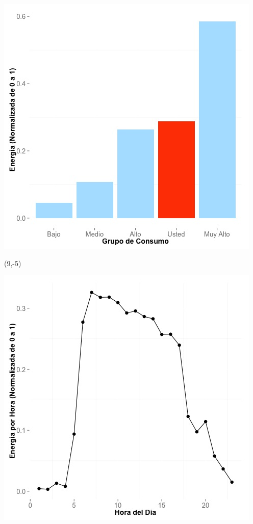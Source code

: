 \documentclass{article}\usepackage[]{graphicx}\usepackage[]{color}
\newenvironment{knitrout}{}{} %
\begin{document}
\begin{knitrout}
\color{fgcolor}
\includegraphics[scale=0.65]{figure/A16_neighbor_plot} 
\end{knitrout}

 \begin{textblock}{1}(9,-5)
\begin{minipage}{20em}
\begingroup

\endgroup
\end{minipage}
\end{textblock}


\begin{knitrout}
\color{fgcolor}
\includegraphics[scale=0.65]{figure/A16_plot_norm_median} 
\end{knitrout}
\end{document}
